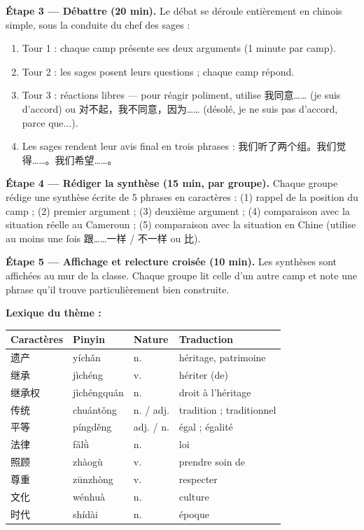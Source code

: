 \documentclass[11pt]{article}
\newcommand{\cle}[1]{{\popxbold\color{popdark}#1}}
\newcounter{popsec}
\newcounter{popsub}
\newcommand{\courssub}[1]{%
  \stepcounter{popsub}%
  \par\vspace{9pt}\noindent{\popxbold\fontsize{11.5}{13}\selectfont\color{popink}{\color{poporange}\thepopsec.\thepopsub}\hspace{6pt}#1}\par\nopagebreak\vspace{4pt}
}
\begin{document}
\textbf{Étape 3 — Débattre (20 min).} Le débat se déroule entièrement en chinois simple, sous la conduite du chef des sages :
\begin{enumerate}
\item Tour 1 : chaque camp présente ses deux arguments (1 minute par camp).
\item Tour 2 : les sages posent leurs questions ; chaque camp répond.
\item Tour 3 : réactions libres — pour réagir poliment, utilise 我同意…… (je suis d'accord) ou 对不起，我不同意，因为…… (désolé, je ne suis pas d'accord, parce que...).
\item Les sages rendent leur avis final en trois phrases : 我们听了两个组。我们觉得……。我们希望……。
\end{enumerate}

\textbf{Étape 4 — Rédiger la synthèse (15 min, par groupe).} Chaque groupe rédige une \cle{synthèse écrite de 5 phrases} en caractères : (1) rappel de la position du camp ; (2) premier argument ; (3) deuxième argument ; (4) comparaison avec la situation réelle au Cameroun ; (5) comparaison avec la situation en Chine (utilise au moins une fois 跟……一样 / 不一样 ou 比).

\textbf{Étape 5 — Affichage et relecture croisée (10 min).} Les synthèses sont affichées au mur de la classe. Chaque groupe lit celle d'un autre camp et note une phrase qu'il trouve particulièrement bien construite.

\courssub{Ressources à mobiliser}

\textbf{Lexique du thème :}

\begin{center}\begin{tabularx}{\linewidth}{|X|X|X|X|}\hline
\rowcolor{popblueL} Caractères & Pinyin & Nature & Traduction \\ \hline
遗产 & yíchǎn & n. & héritage, patrimoine \\ \hline
继承 & jìchéng & v. & hériter (de) \\ \hline
继承权 & jìchéngquán & n. & droit à l'héritage \\ \hline
传统 & chuántǒng & n. / adj. & tradition ; traditionnel \\ \hline
平等 & píngděng & adj. / n. & égal ; égalité \\ \hline
法律 & fǎlǜ & n. & loi \\ \hline
照顾 & zhàogù & v. & prendre soin de \\ \hline
尊重 & zūnzhòng & v. & respecter \\ \hline
文化 & wénhuà & n. & culture \\ \hline
时代 & shídài & n. & époque \\ \hline
\end{tabularx}\end{center}
\end{document}

